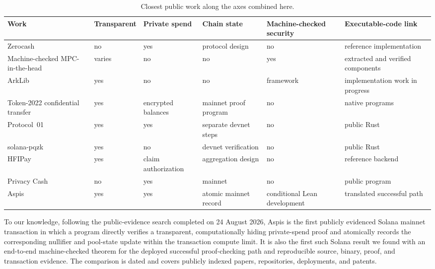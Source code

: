 \begin{table}[t]
\centering
\scriptsize
\setlength{\tabcolsep}{3pt}
\caption{Closest public work along the axes combined here.}
\label{tab:related-comparison}
\begin{tabular}{@{}R{0.20\textwidth}R{0.10\textwidth}R{0.11\textwidth}
R{0.12\textwidth}R{0.14\textwidth}R{0.16\textwidth}@{}}
\toprule
Work & Transparent & Private spend & Chain state & Machine-checked security &
Executable-code link \\
\midrule
Zerocash \cite{BenSassonEtAl2014Zerocash} & no & yes & protocol design & no &
reference implementation \\
Machine-checked MPC-in-the-head \cite{AlmeidaEtAl2021MitH} & varies & no & no &
yes & extracted and verified components \\
ArkLib \cite{ArkLib2026} & yes & no & no & framework & implementation work in
progress \\
Token-2022 confidential transfer \cite{SolanaConfidentialTransfer2026} & yes &
encrypted balances & mainnet proof program & no & native programs \\
Protocol~01 \cite{Protocol01Repository2026} & yes & yes & separate devnet
steps & no & public Rust \\
solana-pqzk \cite{Yano2026SolanaPQZK} & yes & no & devnet verification & no &
public Rust \\
HFIPay \cite{Wang2026HFIPay} & yes & claim authorization & aggregation design &
no & reference backend \\
Privacy Cash \cite{PrivacyCashSetup2026,PrivacyCashMainnet2026} & no & yes &
mainnet & no & public program \\
Aspis & yes & yes & atomic mainnet record & conditional Lean development &
translated successful path \\
\bottomrule
\end{tabular}
\end{table}

To our knowledge, following the public-evidence search completed on 24 August
2026, Aspis is the first publicly evidenced Solana mainnet transaction in
which a program directly verifies a transparent, computationally hiding
private-spend proof and atomically records the corresponding nullifier and
pool-state update within the transaction compute limit.  It is also the first
such Solana result we found with an end-to-end machine-checked theorem for the
deployed successful proof-checking path and reproducible source, binary,
proof, and transaction evidence.  The comparison is dated and covers publicly
indexed papers, repositories, deployments, and patents.
